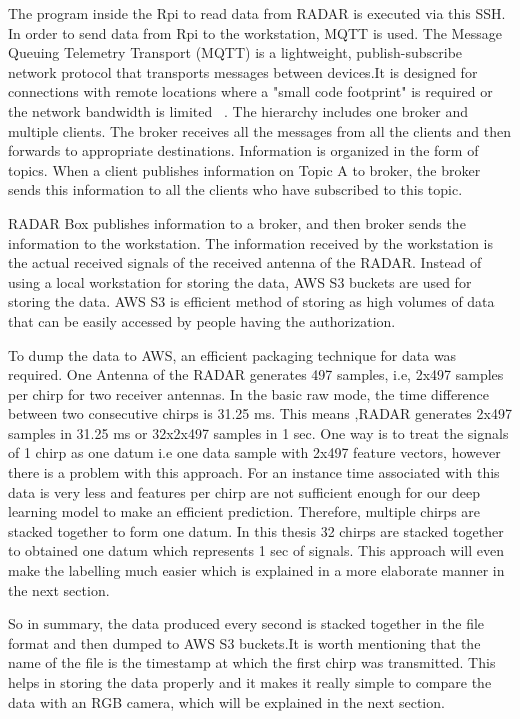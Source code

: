 The program inside the Rpi to read data from RADAR is executed via this SSH. In order to send data from Rpi to the workstation, MQTT is used. The Message Queuing Telemetry Transport (MQTT) is a lightweight, publish-subscribe network protocol that transports messages between devices.It is designed for connections with remote locations where a "small code footprint" is required or the network bandwidth is limited ~\cite{wikipedia_mqtt}.  The hierarchy includes one broker and multiple clients. The broker receives all the messages from all the clients and then forwards to appropriate destinations. Information is organized in the form of topics. When a client publishes information on Topic A to broker, the broker sends this information to all the clients who have subscribed to this topic.

RADAR Box publishes information to a broker, and then broker sends the information to the workstation. The information received by the workstation is the actual received signals of the received antenna of the RADAR.  Instead of using a local workstation for storing the data, AWS S3 buckets are used for storing the data. AWS S3 is efficient method of storing as high volumes of data that can be easily accessed by people having the authorization.


To dump the data to AWS, an efficient packaging technique for data was required. One Antenna of the RADAR generates 497 samples, i.e, 2x497 samples per chirp for two receiver antennas. In the basic raw mode, the time difference between two consecutive chirps is 31.25 ms. This means ,RADAR generates 2x497 samples in 31.25 ms or 32x2x497 samples in 1 sec. 
One way is to treat the signals of 1 chirp as one datum i.e one data sample with 2x497 feature vectors, however there is  a problem with this approach. For an instance time associated with this data is very less and features per chirp are not sufficient enough for our deep learning model to make an efficient prediction. Therefore, multiple chirps are stacked together to form one datum. In this thesis 32 chirps are stacked together to obtained one datum which represents 1 sec of signals. This approach will even make the labelling much easier which is explained in a more elaborate manner in the next section.

So in summary, the data produced every second is stacked together in the file format and then dumped to AWS S3 buckets.It is worth mentioning that the name of the file is the timestamp at which the first chirp was transmitted. This helps in storing the data properly and it makes it really simple to compare the data with an RGB camera, which will be explained in the next section.


